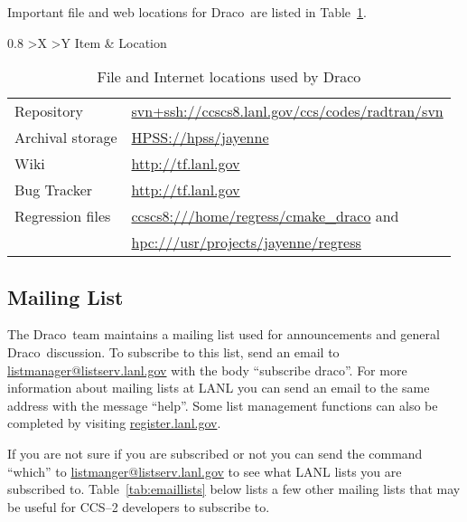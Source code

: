 \documentclass[11pt]{nmemo}
\newcommand{\draco}{{\normalfont\sffamily Draco}}
\begin{document}
Important file and web locations  for \draco\ are listed in Table~\ref{tab:locs}.
%
\begin{table}[!htbp]%
  \caption{File and Internet locations used by \draco}%
  \label{tab:locs}
  \begin{center}
    \begin{tabularx}{0.8\linewidth}{
        >{\setlength{\hsize}{0.4\hsize}}X
        >{\setlength{\hsize}{1.0\hsize}}Y}
      \hline\hline
     Item & Location \\
    \end{tabularx}
    \begin{tabularx}{0.8\linewidth}{
        >{\setlength{\hsize}{0.4\hsize}}X
        >{\setlength{\hsize}{1.0\hsize}}X}
      \hline
Repository & \url{svn+ssh://ccscs8.lanl.gov/ccs/codes/radtran/svn}\\
Archival storage & \url{HPSS://hpss/jayenne}\\
Wiki & \url{http://tf.lanl.gov}\\
Bug Tracker & \url{http://tf.lanl.gov}\\
Regression files & \url{ccscs8:///home/regress/cmake_draco} and \\
& \url{hpc:///usr/projects/jayenne/regress}\\
      \hline\hline
    \end{tabularx}
  \end{center}
\end{table}

\subsection{Mailing List}

The \draco\ team maintains a mailing list used for announcements and
general \draco\ discussion.  To subscribe to this list, send an email
to \url{listmanager@listserv.lanl.gov} with the body ``subscribe
draco''.  For more information about mailing lists at LANL you can
send an email to the same address with the message ``help''.  Some
list management functions can also be completed by visiting
\url{register.lanl.gov}.

If you are not sure if you are subscribed or not you can send the
command ``which'' to \url{listmanger@listserv.lanl.gov} to see what
LANL lists you are subscribed to.  Table~\ref{tab:emaillists} below
lists a few other mailing lists that may be useful for CCS--2
developers to subscribe to.
\end{document}
